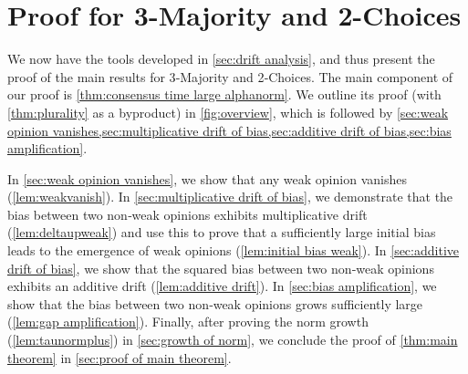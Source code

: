 \documentclass[letterpaper,11pt]{article}
\begin{document}
\section{Proof for 3-Majority and 2-Choices} \label{sec:proof}
We now have the tools developed in \cref{sec:drift analysis}, and thus present the proof of the main results for 3‑Majority and 2‑Choices. 
The main component of our proof is \cref{thm:consensus time large alphanorm}. 
We outline its proof (with \cref{thm:plurality} as a byproduct) in \cref{fig:overview}, which is followed by \cref{sec:weak opinion vanishes,sec:multiplicative drift of bias,sec:additive drift of bias,sec:bias amplification}.

In \cref{sec:weak opinion vanishes}, we show that any weak opinion vanishes (\cref{lem:weakvanish}). 
In \cref{sec:multiplicative drift of bias}, we demonstrate that the bias between two non‑weak opinions exhibits multiplicative drift (\cref{lem:deltaupweak}) and use this to prove that a sufficiently large initial bias leads to the emergence of weak opinions (\cref{lem:initial bias weak}). 
In \cref{sec:additive drift of bias}, we show that the squared bias between two non‑weak opinions exhibits an additive drift (\cref{lem:additive drift}).
In \cref{sec:bias amplification}, we show that the bias between two non‑weak opinions grows sufficiently large (\cref{lem:gap amplification}).
Finally, after proving the norm growth (\cref{lem:taunormplus}) in \cref{sec:growth of norm}, we conclude the proof of \cref{thm:main theorem} in \cref{sec:proof of main theorem}.
\end{document}
